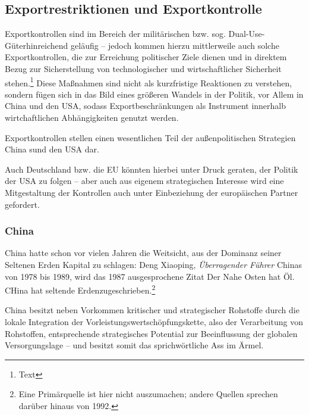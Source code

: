 \documentclass[12pt,a4paper,oneside]{book} %
\begin{document}
\subsection{Exportrestriktionen und Exportkontrolle}



Exportkontrollen sind im Bereich der militärischen bzw. sog. \glqq Dual-Use-Güter\grqq hinreichend geläufig -- jedoch kommen hierzu mittlerweile auch solche Exportkontrollen, die zur Erreichung politischer Ziele dienen und in direktem Bezug zur Sicherstellung von technologischer und wirtschaftlicher Sicherheit stehen.\footnote{Text} Diese Maßnahmen sind nicht als kurzfristige Reaktionen zu verstehen, sondern fügen sich in das Bild eines größeren Wandels in der Politik, vor Allem in China und den USA, sodass Exportbeschränkungen als Instrument innerhalb wirtchaftlichen Abhängigkeiten genutzt werden.

Exportkontrollen stellen einen wesentlichen Teil der außenpolitischen Strategien China sund den USA dar.

Auch Deutschland bzw. die EU könnten hierbei unter Druck geraten, der Politik der USA zu folgen -- aber auch aus eigenem strategischen Interesse wird eine Mitgestaltung der Kontrollen auch unter Einbeziehung der europäischen Partner gefordert.\autocite{Medunic, FiliP. Deutschland muss Exportkontrollen strategischer gestalten, DGAp Memo Nr. 15, Juli 2024, S.1.}


\subsubsection{China}

China hatte schon vor vielen Jahren die Weitsicht, aus der Dominanz seiner Seltenen Erden Kapital zu schlagen: Deng Xiaoping, \textit{Überragender Führer} Chinas von 1978 bis 1989, wird das 1987 ausgesprochene Zitat \glqq Der Nahe Osten hat Öl. CHina hat seltende Erden\grqq zugeschrieben.\footnote{Eine Primärquelle ist hier nicht auszumachen; andere Quellen sprechen darüber hinaus von 1992.}

China besitzt neben Vorkommen kritischer und strategischer Rohstoffe durch die lokale Integration der Vorleistungswertschöpfungskette, also der Verarbeitung von Rohstoffen, entsprechende strategisches Potential zur Beeinflussung der globalen Versorgungslage -- und besitzt somit das sprichwörtliche \glqq Ass im Ärmel\grqq.\autocite{Rachman, Gideon: }
\end{document}
